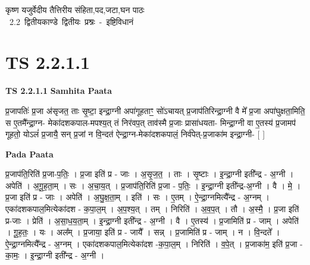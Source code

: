\documentclass[17pt]{extarticle}
\begin{document}
\begin{titlepage}
    \begin{center}
 
\begin{sanskrit}
    { \Huge
    कृष्ण यजुर्वेदीय तैत्तिरीय संहिता,पद,जटा,घन पाठः 
    }
    \\
    \vspace{2.5cm}
    \mbox{ \Huge
    2.2     द्वितीयकाण्डे द्वितीयः प्रश्नः - इष्टिविधानं   }
\end{sanskrit}
\end{center}

\end{titlepage}
\tableofcontents
\pagebreak

\section*{ TS 2.2.1.1 }

\textbf{TS 2.2.1.1 } \newline
\textbf{Samhita Paata} \newline

प्र॒जापतिः॑ प्र॒जा अ॑सृजत॒ ताः सृ॒ष्टा॒ इन्द्रा॒ग्नी अपा॑गूहताꣳ॒॒ सो॑ऽचायत् प्र॒जाप॑तिरिन्द्रा॒ग्नी वै मे᳚ प्र॒जा अपा॑घुक्षता॒मिति॒ स ए॒तमै᳚न्द्रा॒ग्न- मेका॑दशकपाल-मपश्य॒त् तं निर॑वप॒त् ताव॑स्मै प्र॒जाः प्रासा॑धयता- मिन्द्रा॒ग्नी वा ए॒तस्य॑ प्र॒जामप॑ गूहतो॒ योऽलं॑ प्र॒जायै॒ सन् प्र॒जां न वि॒न्दत॑ ऐन्द्रा॒ग्न-मेका॑दशकपालं॒ निर्व॑पेत्-प्र॒जाका॑म इन्द्रा॒ग्नी-  [  ] \newline

\textbf{Pada Paata} \newline

प्र॒जाप॑ति॒रिति॑ प्र॒जा-प॒तिः॒ । प्र॒जा इति॑ प्र - जाः । अ॒सृ॒ज॒त॒ । ताः । सृ॒ष्टाः । इ॒न्द्रा॒ग्नी इती᳚न्द्र - अ॒ग्नी । अपेति॑ । अ॒गू॒ह॒ता॒म् । सः । अ॒चा॒य॒त् । प्र॒जाप॑ति॒रिति॑ प्र॒जा - प॒तिः॒ । इ॒न्द्रा॒ग्नी इती᳚न्द्र-अ॒ग्नी । वै । मे॒ । प्र॒जा इति॑ प्र - जाः । अपेति॑ । अ॒घु॒क्ष॒ता॒म् । इति॑ । सः । ए॒तम् । ऐ॒न्द्रा॒ग्नमित्यै᳚न्द्र - अ॒ग्नम् । एका॑दशकपाल॒मित्येका॑दश - क॒पा॒ल॒म् । अ॒प॒श्य॒त् । तम् । निरिति॑ । अ॒व॒प॒त् । तौ । अ॒स्मै॒ । प्र॒जा इति॑ प्र-जाः । प्रेति॑ । अ॒सा॒ध॒य॒ता॒म् । इ॒न्द्रा॒ग्नी इती᳚न्द्र - अ॒ग्नी । वै । ए॒तस्य॑ । प्र॒जामिति॑ प्र - जाम् । अपेति॑ । गू॒ह॒तः॒ । यः । अल᳚म् । प्र॒जाया॒ इति॑ प्र - जायै᳚ । सन्न् । प्र॒जामिति॑ प्र - जाम् । न । वि॒न्दते᳚ । ऐ॒न्द्रा॒ग्नमित्यै᳚न्द्र - अ॒ग्नम् । एका॑दशकपाल॒मित्येका॑दश -क॒पा॒ल॒म् । निरिति॑ । व॒पे॒त् । प्र॒जाका॑म॒ इति॑ प्र॒जा - का॒मः॒ । इ॒न्द्रा॒ग्नी इती᳚न्द्र - अ॒ग्नी ।  \newline
\end{document}
